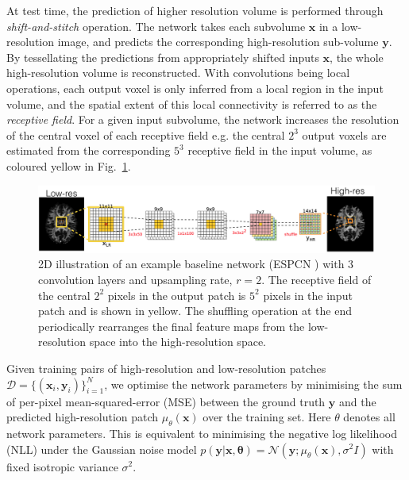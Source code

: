 At test time, the prediction of higher resolution volume is performed through \textit{shift-and-stitch} operation. The network takes each subvolume $\mathbf{x}$ in a low-resolution image, and predicts the corresponding high-resolution sub-volume $\mathbf{y}$. By tessellating the predictions from appropriately shifted inputs $\mathbf{x}$, the whole high-resolution volume is reconstructed. With convolutions being local operations, each output voxel is only inferred from a local region in the input volume, and the spatial extent of this local connectivity is referred to as the \textit{receptive field}. For a given input subvolume, the network increases the resolution of the central voxel of each receptive field e.g. the central $2^3$ output voxels are estimated from the corresponding $5^3$ receptive field in the input volume, as coloured yellow in Fig.~\ref{fig:ESPCN}.

\begin{figure}[t]
	\includegraphics[width=\linewidth]{chapter_3/figures/fig_1_2.png}
	\centering	
	\caption{\footnotesize 2D illustration of an example baseline network (ESPCN \cite{shi2016real}) with $3$ convolution layers and upsampling rate, $r=2$. The receptive field of the central $2^2$ pixels in the output patch is $5^2$ pixels in the input patch and is shown in yellow. The shuffling operation at the end periodically rearranges the final feature maps from the low-resolution space into the high-resolution space.} 
	\label{fig:ESPCN}
	
\end{figure}


Given training pairs of high-resolution and low-resolution patches $\mathcal{D}=\{(\mathbf{x}_i,\mathbf{y}_i)\}_{i=1}^N$, we optimise the network parameters by minimising the sum of per-pixel mean-squared-error (MSE) between the ground truth $\mathbf{y}$ and the predicted high-resolution patch $\mu_{\theta}(\mathbf{x})$ over the training set. Here $\theta$ denotes all network parameters. This is equivalent to minimising the negative log likelihood (NLL) under the Gaussian noise model $p(\mathbf{y}|\mathbf{x},\mathbf{\theta}) = \mathcal{N}(\mathbf{y}; \mu_{\theta}(\mathbf{x}), \sigma^2I)$ with fixed isotropic variance $\sigma^2$. %

